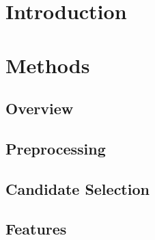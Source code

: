 \documentclass[a4paper, 10pt, english, onecolumn]{article}
\title{\fontfamily{phv}\selectfont{Another ad-hoc CAD system}}
\author{
  \textbf{W. Kanters} - \href{mailto:kantersw@gmail.com}{kantersw@gmail.com} \\
  \textbf{T. de Ruijter} - \href{mailto:t.deruijter@student.ru.nl}{t.deruijter@student.ru.nl}\\
}
\date{\fontfamily{ptm}\selectfont{\small{\bfseries{\today - Radboud
Universiteit Nijmegen}}}\\[0.5cm]\rule{\linewidth}{0.3mm}}
\begin{document}
\maketitle

\setlength{\parindent}{0.0cm}
\setlength{\parskip}{0.25cm}

\section{Introduction}




\section{Methods}

	\subsection{Overview}


	\subsection{Preprocessing}


	\subsection{Candidate Selection}


	\subsection{Features}

\end{document}
